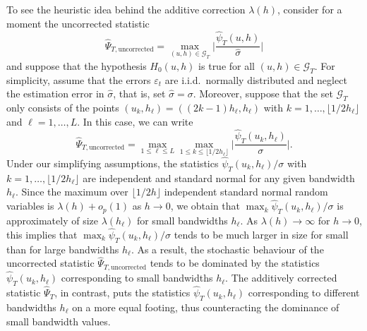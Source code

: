 To see the heuristic idea behind the additive correction $\lambda(h)$, consider for a moment the uncorrected statistic
\[ \widehat{\Psi}_{T,\text{uncorrected}} = \max_{(u,h) \in \mathcal{G}_T} \Big|\frac{\widehat{\psi}_T(u,h)}{\widehat{\sigma}}\Big| \]
and suppose that the hypothesis $H_0(u,h)$ is true for all $(u,h) \in \mathcal{G}_T$. For simplicity, assume that the errors $\varepsilon_t$ are i.i.d.\ normally distributed and neglect the estimation error in $\widehat{\sigma}$, that is, set $\widehat{\sigma} = \sigma$. Moreover, suppose that the set $\mathcal{G}_T$ only consists of the points $(u_k,h_\ell) = ((2k - 1)h_\ell,h_\ell)$ with $k = 1,\ldots,\lfloor 1/2h_\ell \rfloor$ and $\ell = 1,\ldots,L$. In this case, we can write
\[ \widehat{\Psi}_{T,\text{uncorrected}} = \max_{1 \le \ell \le L} \max_{1 \le k \le \lfloor 1/2h_\ell \rfloor} \Big|\frac{\widehat{\psi}_T(u_k,h_\ell)}{\sigma}\Big|. \]
Under our simplifying assumptions, the statistics $\widehat{\psi}_T(u_k,h_\ell)/\sigma$ with $k = 1,\ldots,\lfloor 1/2h_\ell \rfloor$ are independent and standard normal for any given bandwidth $h_\ell$. Since the maximum over $\lfloor 1/2h \rfloor$ independent standard normal random variables is $\lambda(h) + o_p(1)$ as $h \rightarrow 0$, we obtain that $\max_{k} \widehat{\psi}_T(u_k,h_\ell)/\sigma$ is approximately of size $\lambda(h_\ell)$ for small bandwidths $h_\ell$. As $\lambda(h) \rightarrow \infty$ for $h \rightarrow 0$, this implies that $\max_{k} \widehat{\psi}_T(u_k,h_\ell)/\sigma$ tends to be much larger in size for small than for large bandwidths $h_\ell$. As a result, the stochastic behaviour of the uncorrected statistic $\widehat{\Psi}_{T,\text{uncorrected}}$ tends to be dominated by the statistics $\widehat{\psi}_T(u_k,h_\ell)$ corresponding to small bandwidths $h_\ell$. The additively corrected statistic $\widehat{\Psi}_T$, in contrast, puts the statistics $\widehat{\psi}_T(u_k,h_\ell)$ corresponding to different bandwidths $h_\ell$ on a more equal footing, thus counteracting the dominance of small bandwidth values. 


